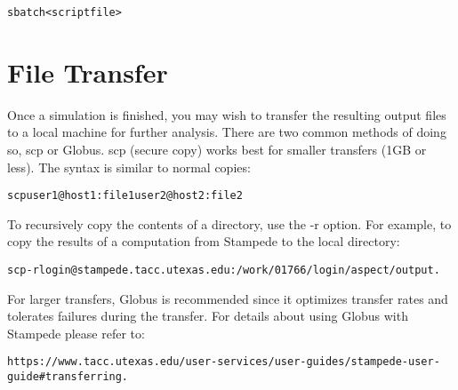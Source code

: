 \documentclass[12pt]{article}
\begin{document}
 \begin{alltt}\footnotesize
sbatch <script file> 
  \end{alltt}

\section{File Transfer}
Once a simulation is finished, you may wish to transfer the resulting output files to a local machine for further analysis. There are two common methods of doing so, scp or Globus. scp (secure copy) works best for smaller transfers (1GB or less). The syntax is similar to normal copies: \\

 \begin{alltt}\footnotesize
scp user1@host1:file1 user2@host2:file2 
  \end{alltt}

To recursively copy the contents of a directory, use the -r option. For example, to copy the results of a computation from Stampede to the local directory: 

 \begin{alltt}\footnotesize
scp -r login@stampede.tacc.utexas.edu:/work/01766/login/aspect/output . 
  \end{alltt}

For larger transfers, Globus is recommended since it optimizes transfer rates and tolerates
failures during the transfer. For details about using Globus with Stampede please refer to: 

 \begin{alltt}\footnotesize
https://www.tacc.utexas.edu/user-services/user-guides/stampede-user-guide\#transferring.
  \end{alltt}
 

 
\end{document}
